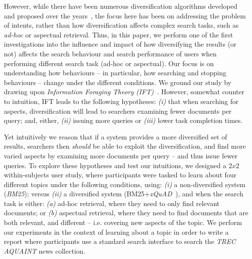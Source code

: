 However, while there have been numerous diversification algorithms developed and proposed over the years~\cite{carbonell1998mmr,chen2006lessismore,santos2010query_reformulations_diversification,santos2011intent,zhai2015subtopics}, the focus here has been on addressing the problem of intents, rather than how diversification affects complex search tasks, such as \emph{ad-hoc} or aspectual retrieval. Thus, in this paper, we perform one of the first investigations into the influence and impact of how diversifying the results (or not) affects the search behaviour and search performance of users when performing different search task (ad-hoc or aspectual). Our focus is on understanding how behaviours -- in particular, how searching and stopping behaviours -- change under the different conditions. We ground our study by drawing upon \emph{Information Foraging Theory (IFT)}~\cite{pirolli1999ift}. However, somewhat counter to intuition, IFT leads to the following hypotheses: \emph{(i)} that when searching for aspects, diversification will lead to searchers examining fewer documents per query; and, either, \emph{(ii)} issuing more queries or \emph{(iii)} lower task completion times.

Yet intuitively we reason that if a system provides a more diversified set of results, searchers then \emph{should} be able to exploit the diversification, and find more varied aspects by examining more documents per query -- and thus issue fewer queries. To explore these hypotheses and test our intuitions, we designed a $2x2$ within-subjects user study, where participants were tasked to learn about four different topics under the following conditions, using: \emph{(i)} a non-diversified system (\emph{BM25}); versus \emph{(ii)} a diversified system (BM25+\emph{xQuAD}~\cite{santos2010query_reformulations_diversification}), and when the search task is either: \emph{(a)} ad-hoc retrieval, where they need to only find relevant documents; or \emph{(b)} aspectual retrieval, where they need to find documents that are both relevant, and different -- i.e. covering new aspects of the topic. We perform our experiments in the context of learning about a topic in order to write a report where participants use a standard search interface to search the \emph{TREC AQUAINT} news collection. 

